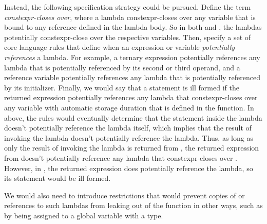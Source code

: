 \documentclass{wg21}
\begin{document}
Instead, the following specification strategy could be pursued. Define the term
\emph{constexpr-closes over}, where a lambda constexpr-closes over any variable
that is bound to any  reference defined in the lambda body. So
in both  and , the lambdas potentially constexpr-close over
the respective  variables. Then, specify a set of core language rules
that define when an expression or variable \emph{potentially references} a
lambda. For example, a ternary expression potentially references any lambda that
is potentially referenced by its second or third operand, and a reference
variable potentially references any lambda that is potentially referenced by its
initializer. Finally, we would say that a  statement is ill
formed if the returned expression potentially references any lambda that
constexpr-closes over any variable with automatic storage duration that is
defined in the function. In  above, the rules would eventually
determine that the  statement inside the lambda doesn't
potentially reference the lambda itself, which implies that the result of
invoking the lambda doesn't potentially reference the lambda. Thus, as long as
only the result of invoking the lambda is returned from , the returned
expression from  doesn't potentially reference any lambda that
constexpr-closes over . However, in , the returned expression
does potentially reference the lambda, so its  statement would be
ill formed.

We would also need to introduce restrictions that would prevent copies of or
references to such lambdas from leaking out of the function in other ways, such
as by being assigned to a global variable with a  type.
\end{document}
